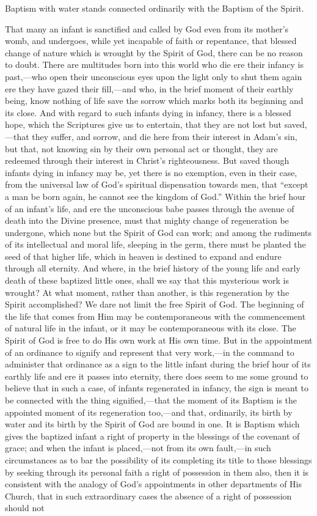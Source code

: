 \documentclass[]{book}
\begin{document}
Baptism with water stands connected ordinarily with the Baptism of the Spirit.

That many an infant is sanctified and called by God even from its mother's womb, and undergoes, while yet incapable of faith or repentance, that blessed change of nature which is wrought by the Spirit of God, there can be no reason to doubt. There are multitudes born into this world who die ere their infancy is past,---who open their unconscious eyes upon the light only to shut them again ere they have gazed their fill,---and who, in the brief moment of their earthly being, know nothing of life save the sorrow which marks both its beginning and its close. And with regard to such infants dying in infancy, there is a blessed hope, which the Scriptures give us to entertain, that they are not lost but saved,---that they suffer, and sorrow, and die here from their interest in Adam's sin, but that, not knowing sin by their own personal act or thought, they are redeemed through their interest in Christ's righteousness. But saved though infants dying in infancy may be, yet there is no exemption, even in their case, from the universal law of God's spiritual dispensation towards men, that ``except a man be born again, he cannot see the kingdom of God.'' Within the brief hour of an infant's life, and ere the unconscious babe passes through the avenue of death into the Divine presence, must that mighty change of regeneration be undergone, which none but the Spirit of God can work; and among the rudiments of its intellectual and moral life, sleeping in the germ, there must be planted the seed of that higher life, which in heaven is destined to expand and endure through all eternity. And where, in the brief history of the young life and early death of these baptized little ones, shall we say that this mysterious work is wrought? At what moment, rather than another, is this regeneration by the Spirit accomplished? We dare not limit the free Spirit of God. The beginning of the life that comes from Him may be contemporaneous with the commencement of natural life in the infant, or it may be contemporaneous with its close. The Spirit of God is free to do His own work at His own time. But in the appointment of an ordinance to signify and represent that very work,---in the command to administer that ordinance as a sign to the little infant during the brief hour of its earthly life and ere it passes into eternity, there does seem to me some ground to believe that in such a case, of infants regenerated in infancy, the sign is meant to be connected with the thing signified,---that the moment of its Baptism is the appointed moment of its regeneration too,---and that, ordinarily, its birth by water and its birth by the Spirit of God are bound in one. It is Baptism which gives the baptized infant a right of property in the blessings of the covenant of grace; and when the infant is placed,---not from its own fault,---in such circumstances as to bar the possibility of its completing its title to those blessings by seeking through its personal faith a right of possession in them also, then it is consistent with the analogy of God's appointments in other departments of His Church, that in such extraordinary cases the absence of a right of possession should not 
\end{document}
